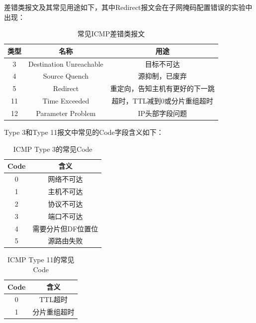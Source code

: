 差错类报文及其常见用途如下，其中Redirect报文会在子网掩码配置错误的实验中出现：
\begin{table}[H]
    \centering
    \caption{常见ICMP差错类报文}
    \label{tab:icmp-error-types}
    \begin{tabular}{ccc}
        \toprule
        类型 & 名称 & 用途 \\
        \midrule
        3  & Destination Unreachable & 目标不可达 \\
        4  & Source Quench & 源抑制，已废弃 \\
        5  & Redirect & 重定向，告知主机有更好的下一跳 \\
        11 & Time Exceeded & 超时，TTL减到0或分片重组超时 \\
        12 & Parameter Problem & IP头部字段问题 \\
        \bottomrule
    \end{tabular}
\end{table}

Type 3和Type 11报文中常见的Code字段含义如下：
\begin{table}[H]
    \centering
    \caption{ICMP Type 3的常见Code}
    \label{tab:icmp-type3-code}
    \begin{tabular}{cc}
        \toprule
        Code & 含义 \\
        \midrule
        0 & 网络不可达 \\
        1 & 主机不可达 \\
        2 & 协议不可达 \\
        3 & 端口不可达 \\
        4 & 需要分片但DF位置位 \\
        5 & 源路由失败 \\
        \bottomrule
    \end{tabular}
\end{table}

\begin{table}[H]
    \centering
    \caption{ICMP Type 11的常见Code}
    \label{tab:icmp-type11-code}
    \begin{tabular}{cc}
        \toprule
        Code & 含义 \\
        \midrule
        0 & TTL超时 \\
        1 & 分片重组超时 \\
        \bottomrule
    \end{tabular}
\end{table}


